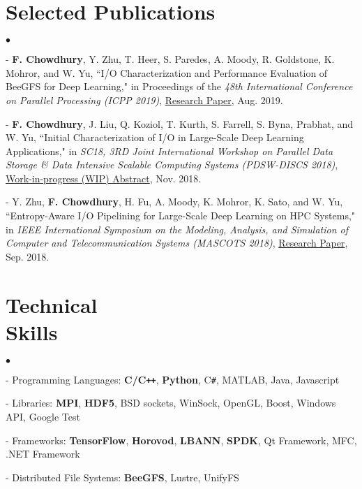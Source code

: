 \documentclass[margin,line]{res}
\newenvironment{list2}{
  \begin{list}{$\bullet$}{%
      \setlength{\itemsep}{0in}
      \setlength{\parsep}{0in} \setlength{\parskip}{0in}
      \setlength{\topsep}{0in} \setlength{\partopsep}{0in} 
      \setlength{\leftmargin}{0.2in}}}{\end{list}}
\begin{document}
\begin{resume}
\vspace*{-.05in}

\section{\sc Selected Publications}
\begin{list2}
\item[ - ] {\bf F. Chowdhury}, Y. Zhu, T. Heer, S. Paredes, A. Moody, R. Goldstone, K. Mohror, and W. Yu, ``I/O Characterization and Performance Evaluation of BeeGFS for Deep Learning," in Proceedings of the \textit{48th International Conference on Parallel Processing (ICPP 2019)}, \href{http://www.osti.gov/servlets/purl/1559405}{Research Paper}, Aug. 2019.
\vspace{.1cm} 
\item[ - ] {\bf F. Chowdhury}, J. Liu, Q. Koziol, T. Kurth, S. Farrell, S. Byna, Prabhat, and W. Yu, ``Initial Characterization of I/O in Large-Scale Deep Learning Applications," in \textit{SC18, 3RD Joint International Workshop on Parallel Data Storage \& Data Intensive Scalable Computing Systems (PDSW-DISCS 2018)}, \href{http://www.pdsw.org/pdsw-discs18/wips/abstracts/chowdhury-wip-pdsw-discs18.pdf}{Work-in-progress (WIP) Abstract}, Nov. 2018.
\vspace{.1cm} 
\item[ - ] Y. Zhu, {\bf F. Chowdhury}, H. Fu, A. Moody, K. Mohror, K. Sato, and W. Yu, ``Entropy-Aware I/O Pipelining for Large-Scale Deep Learning on HPC Systems," in \textit{IEEE International Symposium on the Modeling, Analysis, and Simulation of Computer and Telecommunication Systems (MASCOTS 2018)}, \href{http://www.mscs.mu.edu/~mascots/Papers/72.pdf}{Research Paper}, Sep. 2018.
\end{list2}

\vspace*{-.05in}

\section{\sc Technical \\Skills}
\begin{list2}
\item[ - ] Programming Languages: {\bf C/C\texttt{++}}, {\bf Python}, C\texttt{\#}, MATLAB, Java, Javascript
\item[ - ] Libraries: {\bf MPI}, {\bf HDF5}, BSD sockets, WinSock, OpenGL, Boost, Windows API, Google Test
\item[ - ] Frameworks: {\bf TensorFlow}, {\bf Horovod}, {\bf LBANN}, {\bf SPDK}, Qt Framework, MFC, .NET Framework
\item[ - ] Distributed File Systems: {\bf BeeGFS}, Lustre, UnifyFS
\end{list2}


\end{resume}
\end{document}
